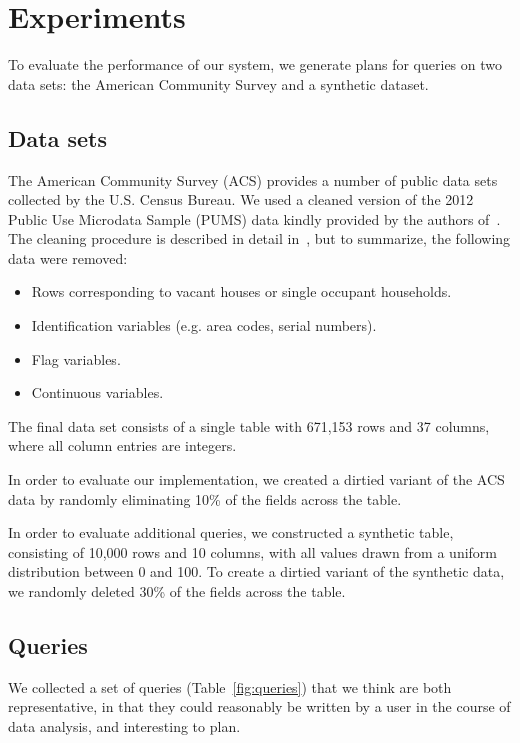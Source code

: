 \section{Experiments}

To evaluate the performance of our system, we generate plans for queries on two data sets: the American Community Survey and a synthetic dataset.
\subsection{Data sets} \label{subsec:datasets}

The American Community Survey (ACS) provides a number of public data sets collected by the U.S. Census Bureau.
We used a cleaned version of the 2012 Public Use Microdata Sample (PUMS) data kindly provided by the authors of~\cite{akande2015empirical}.
The cleaning procedure is described in detail in~\cite{akande2015empirical}, but to summarize, the following data were removed:
\begin{itemize}
\item Rows corresponding to vacant houses or single occupant households.
\item Identification variables (e.g. area codes, serial numbers).
\item Flag variables.
\item Continuous variables.
\end{itemize}
The final data set consists of a single table with 671,153 rows and 37 columns, where all column entries are integers.

In order to evaluate our implementation, we created a dirtied variant of the ACS data by randomly eliminating
10\% of the fields across the table.

In order to evaluate additional queries, we constructed a synthetic table, consisting of 10,000 rows and 10 columns, with
all values drawn from a uniform distribution between 0 and 100. To create a dirtied variant of the synthetic data, we randomly deleted 30\% of the fields
across the table.

\subsection{Queries}

We collected a set of queries (Table~\ref{fig:queries}) that we think are both representative, in that they could reasonably be written by a user in the course of data analysis, and interesting to plan.


